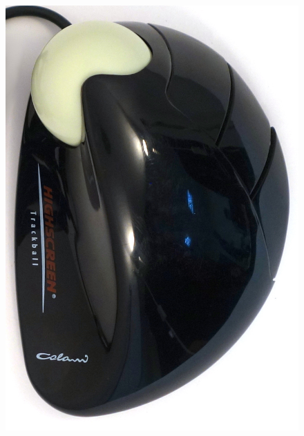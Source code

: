 \documentclass[11pt, a4paper]{article}
\begin{document}
\begin{figure}[h]
    \centering
    \includegraphics[scale=0.51]{1993_colani_trackball/top_b_30.jpg}

\end{figure}
\end{document}
